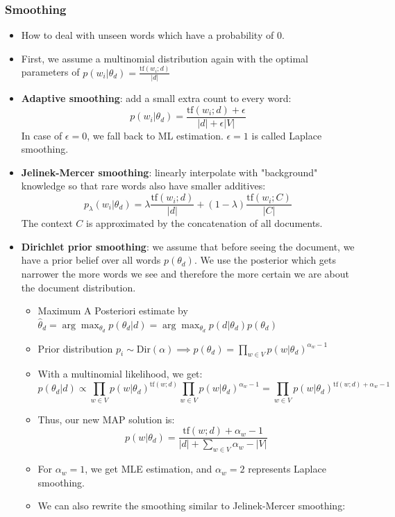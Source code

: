\subsubsection{Smoothing}
\begin{itemize}
	\item How to deal with unseen words which have a probability of 0.
	\item First, we assume a multinomial distribution again with the optimal parameters of $p(w_i|\theta_d) = \frac{\text{tf}(w_i;d)}{|d|}$
	\item \textbf{Adaptive smoothing}: add a small extra count to every word:
	$$p(w_i|\theta_d) = \frac{\text{tf}(w_i;d) + \epsilon}{|d| + \epsilon |V|}$$
	In case of $\epsilon=0$, we fall back to ML estimation. $\epsilon=1$ is called Laplace smoothing.
	\item \textbf{Jelinek-Mercer smoothing}: linearly interpolate with "background" knowledge so that rare words also have smaller additives:
	$$p_{\lambda}(w_i|\theta_d) = \lambda \frac{\text{tf}(w_i;d)}{|d|} + (1 - \lambda) \frac{\text{tf}(w_i;C)}{|C|}$$
	The context $C$ is approximated by the concatenation of all documents.
	\item \textbf{Dirichlet prior smoothing}: we assume that before seeing the document, we have a prior belief over all words $p(\theta_d)$. We use the posterior which gets narrower the more words we see and therefore the more certain we are about the document distribution.
	\begin{itemize}
		\item Maximum A Posteriori estimate by $\hat{\theta}_d = \arg\max_{\theta_d} p(\theta_d|d) = \arg\max_{\theta_d} p(d|\theta_d) p(\theta_d)$
		\item Prior distribution $p_i\sim \text{Dir}(\alpha) \implies p(\theta_d) = \prod\limits_{w \in V} p(w|\theta_d)^{\alpha_w - 1}$
		\item With a multinomial likelihood, we get:
		$$p(\theta_d | d) \propto \prod\limits_{w \in V} p(w|\theta_d)^{\text{tf}(w;d)} \prod\limits_{w \in V} p(w|\theta_d)^{\alpha_w - 1} = \prod\limits_{w \in V} p(w|\theta_d)^{\text{tf}(w;d) + \alpha_w - 1}$$
		\item Thus, our new MAP solution is:
		$$p(w|\theta_d) = \frac{\text{tf}(w;d) + \alpha_w - 1}{|d| + \sum_{w\in V}\alpha_w - |V|}$$
		\item For $\alpha_w = 1$, we get MLE estimation, and $\alpha_w = 2$ represents Laplace smoothing.
		\item We can also rewrite the smoothing similar to Jelinek-Mercer smoothing:

\end{itemize}
\end{itemize}
